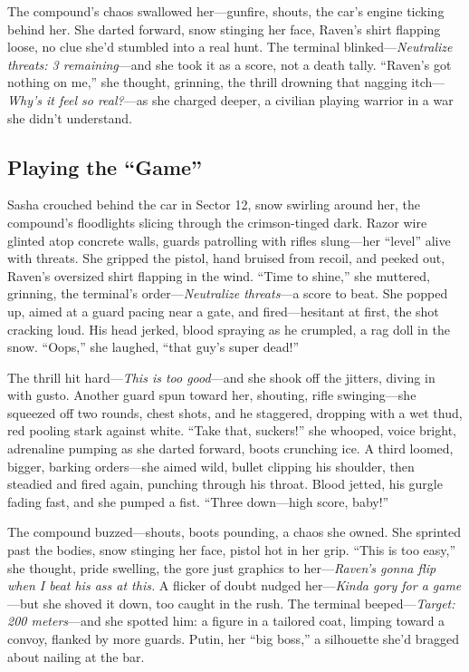 \documentclass[12pt]{book}
\begin{document}
The compound’s chaos swallowed her—gunfire, shouts, the car’s engine ticking behind her. She darted forward, snow stinging her face, Raven’s shirt flapping loose, no clue she’d stumbled into a real hunt. The terminal blinked—\textit{Neutralize threats: 3 remaining}—and she took it as a score, not a death tally. “Raven’s got nothing on me,” she thought, grinning, the thrill drowning that nagging itch—\textit{Why’s it feel so real?}—as she charged deeper, a civilian playing warrior in a war she didn’t understand.

\subsection{Playing the ``Game''}

Sasha crouched behind the car in Sector 12, snow swirling around her, the compound’s floodlights slicing through the crimson-tinged dark. Razor wire glinted atop concrete walls, guards patrolling with rifles slung—her “level” alive with threats. She gripped the pistol, hand bruised from recoil, and peeked out, Raven’s oversized shirt flapping in the wind. “Time to shine,” she muttered, grinning, the terminal’s order—\textit{Neutralize threats}—a score to beat. She popped up, aimed at a guard pacing near a gate, and fired—hesitant at first, the shot cracking loud. His head jerked, blood spraying as he crumpled, a rag doll in the snow. “Oops,” she laughed, “that guy’s super dead!”

The thrill hit hard—\textit{This is too good}—and she shook off the jitters, diving in with gusto. Another guard spun toward her, shouting, rifle swinging—she squeezed off two rounds, chest shots, and he staggered, dropping with a wet thud, red pooling stark against white. “Take that, suckers!” she whooped, voice bright, adrenaline pumping as she darted forward, boots crunching ice. A third loomed, bigger, barking orders—she aimed wild, bullet clipping his shoulder, then steadied and fired again, punching through his throat. Blood jetted, his gurgle fading fast, and she pumped a fist. “Three down—high score, baby!”

The compound buzzed—shouts, boots pounding, a chaos she owned. She sprinted past the bodies, snow stinging her face, pistol hot in her grip. “This is too easy,” she thought, pride swelling, the gore just graphics to her—\textit{Raven’s gonna flip when I beat his ass at this.} A flicker of doubt nudged her—\textit{Kinda gory for a game}—but she shoved it down, too caught in the rush. The terminal beeped—\textit{Target: 200 meters}—and she spotted him: a figure in a tailored coat, limping toward a convoy, flanked by more guards. Putin, her “big boss,” a silhouette she’d bragged about nailing at the bar.
\end{document}

